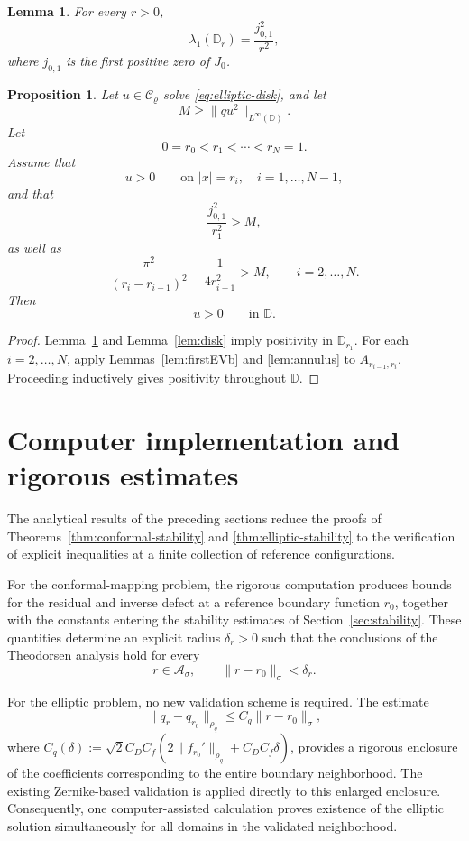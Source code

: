 \documentclass[11pt,a4paper]{amsart}
\newtheorem{lemma}[theorem]{Lemma}
\newtheorem{proposition}[theorem]{Proposition}
\begin{document}
\begin{lemma}\label{lem:firstevB}
	For every $r>0$,
	\[
	\lambda_1(\mathbb D_r)
	=
	\frac{j_{0,1}^2}{r^2},
	\]
	where $j_{0,1}$ is the first positive zero of $J_0$.
\end{lemma}


\begin{proposition}\label{prop:positive}
	Let $u\in\mathcal C_\varrho$ solve
	\eqref{eq:elliptic-disk}, and let
	\[
	M\ge
	\|qu^2\|_{L^\infty(\mathbb D)}.
	\]
	Let
	\[
	0=r_0<r_1<\cdots<r_N=1.
	\]
	Assume that
	\[
	u>0
	\qquad
	\text{on }|x|=r_i,
	\quad
	i=1,\ldots,N-1,
	\]
	and that
	\[
	\frac{j_{0,1}^2}{r_1^2}>M,
	\]
	as well as
	\[
	\frac{\pi^2}{(r_i-r_{i-1})^2}
	-
	\frac1{4r_{i-1}^2}
	>M,
	\qquad
	i=2,\ldots,N.
	\]
	Then
	\[
	u>0
	\qquad
	\text{in }\mathbb D.
	\]
\end{proposition}

\begin{proof}
	Lemma~\ref{lem:firstevB} and Lemma~\ref{lem:disk} imply positivity
	in $\mathbb D_{r_1}$. For each	$i=2,\ldots,N$, apply
	Lemmas~\ref{lem:firstEVb} and \ref{lem:annulus} to
$A_{r_{i-1},r_i}$.
	Proceeding inductively gives positivity throughout $\mathbb D$.
\end{proof}


\section{Computer implementation and rigorous estimates}
\label{sec:cap}

The analytical results of the preceding sections reduce the proofs of
Theorems~\ref{thm:conformal-stability} and
\ref{thm:elliptic-stability} to the verification of explicit
inequalities at a finite collection of reference configurations.

For the conformal-mapping problem, the rigorous computation produces
bounds for the residual and inverse defect at a reference boundary
function $r_0$, together with the constants entering the stability
estimates of Section~\ref{sec:stability}. These quantities determine
an explicit radius $\delta_r>0$ such that the conclusions of the
Theodorsen analysis hold for every
\[
r\in\mathcal A_\sigma,
\qquad
\|r-r_0\|_\sigma<\delta_r.
\]

For the elliptic problem, no new validation scheme is required.
The estimate
\[
\|q_r-q_{r_0}\|_{\rho_q}
\le
C_q\|r-r_0\|_\sigma,
\]
where $C_q(\delta):=\sqrt{2}C_D C_f\left(2\|f_{r_0}'\|_{\rho_q}+C_D C_f\delta\right)$,
provides a rigorous enclosure of the coefficients corresponding to
the entire boundary neighborhood. The existing Zernike-based
validation is applied directly to this enlarged enclosure.
Consequently, one computer-assisted calculation proves existence of
the elliptic solution simultaneously for all domains in the
validated neighborhood.
\end{document}
